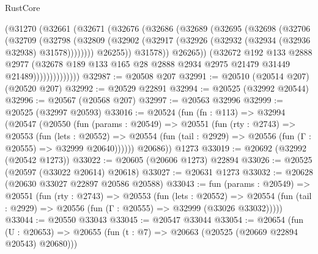 \begin{lexlean}{RustCore}
\begin{coremodule}
                      (@31270
                        (@32661
                          (@32671
                            (@32676
                              (@32686
                                (@32689
                                  (@32695
                                    (@32698
                                      (@32706
                                        (@32709
                                          (@32798
                                            (@32809
                                              (@32902
                                                (@32917
                                                  (@32926
                                                    (@32932 (@32934 (@32936 @32938) @31578))))))))
                                        @26255))
                                    @31578))
                                @26265))
                            (@32672
                              @192
                              @133
                              @2888
                              @2977
                              (@32678
                                @189
                                @133
                                @165
                                @28
                                @2888
                                @2934
                                @2975
                                @21479
                                @31449
                                @21489))))))))))))))
@32987 := @20508 @207
@32991 := @20510 (@20514 @207) (@20520 @207)
@32992 := @20529 @22891
@32994 := @20525 (@32992 @20544)
@32996 := @20567 (@20568 @207)
@32997 := @20563 @32996
@32999 := @20525 (@32997 @20593)
@33016 := @20524
    (fun (fn : @113) =>
    @32994
      (@20547
        (@20550
          (fun (params : @20549) =>
          @20551
            (fun (rty : @2743) =>
            @20553
              (fun (lets : @20552) =>
              @20554 (fun (tail : @2929) => @20556 (fun (Γ : @20555) => @32999 @20640))))))
        @20686))
    @1273
@33019 := @20692 (@32992 (@20542 @1273))
@33022 := @20605 (@20606 @1273) @22894
@33026 := @20525 (@20597 (@33022 @20614) @20618)
@33027 := @20631 @1273
@33032 := @20628 (@20630 @33027 @22897 @20586 @20588)
@33043 := fun (params : @20549) =>
  @20551
    (fun (rty : @2743) =>
    @20553
      (fun (lets : @20552) =>
      @20554 (fun (tail : @2929) => @20556 (fun (Γ : @20555) => @32999 (@33026 @33032)))))
@33044 := @20550 @33043
@33045 := @20547 @33044
@33054 := @20654
    (fun (U : @20653) => @20655 (fun (t : @7) => @20663 (@20525 (@20669 @22894 @20543) @20680)))

\end{coremodule}
\end{lexlean}
